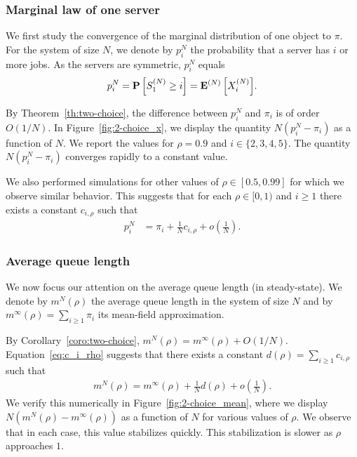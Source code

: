\documentclass[acmlarge]{acmart}
\newcommand\SN{S^{(N)}}
\newcommand\XN{X^{(N)}}
\newcommand\espN[1]{{\mathchoice{\bespN{#1}}{\sespN{#1}}{\sespN{#1}}{\sespN{#1}}}}
\newcommand\bespN[1]{\mathbf{E}^{(N)}\left[#1\right]}
\newcommand\sespN[1]{\mathbf{E}^{(N)}[#1]}
\newcommand\Proba[1]{{\mathchoice{\bProba{#1}}{\sProba{#1}}{\sProba{#1}}{\sProba{#1}}}}
\newcommand\bProba[1]{\mathbf{P}\left[#1\right]}
\newcommand\sProba[1]{\mathbf{P}[#1]}
\newcommand\p[1]{\left(#1\right)}
\begin{document}
\subsubsection{Marginal law of one server}

We first study the convergence of the marginal distribution of one
object to $\pi$. For the system of size $N$, we denote by $p^N_i$ the
probability that a server has $i$ or more jobs. As the servers are
symmetric, $p^N_i$ equals
\begin{align*}
  p^N_i=\Proba{\SN_1\ge i} = \espN{\XN_i}. 
\end{align*}

By Theorem~\ref{th:two-choice}, the difference between $p^N_i$ and
$\pi_i$ is of order $O(1/N)$. In Figure~\ref{fig:2-choice_x}, we
display the quantity $N(p^N_i-\pi_i)$ as a function of $N$. We report
the values for $\rho=0.9$ and $i\in\{2,3,4,5\}$. The quantity
$N(p^N_i-\pi_i)$ converges rapidly to a constant value.

We also performed simulations for other values of $\rho\in[0.5,0.99]$
for which we observe similar behavior.  This suggests that for each
$\rho\in[0,1)$ and $i\ge1$ there exists a constant $c_{i,\rho}$ such
that
\begin{align}
  \label{eq:c_i_rho}
  p^N_i&=\pi_i + \frac1N c_{i,\rho} + o\p{\frac1N}.
\end{align}


\subsubsection{Average queue length}


We now focus our attention on the average queue length (in
steady-state). We denote by $m^N(\rho)$ the average queue length in
the system of size $N$ and by $m^\infty(\rho)= \sum_{i\ge1}\pi_i$ its
mean-field approximation.

By Corollary~\ref{coro:two-choice},
$m^N(\rho) = m^\infty(\rho)+O(1/N)$. Equation~\eqref{eq:c_i_rho}
suggests that there exists a constant
$d(\rho)=\sum_{i\ge1}c_{i,\rho}$ such that
\begin{align}
  \label{eq:improved_mf}
  m^N(\rho)=m^\infty(\rho) + \frac{1}{N}d(\rho) + o\p{\frac1N}.
\end{align} 
We verify this numerically in Figure~\ref{fig:2-choice_mean}, where we
display $N(m^N(\rho)-m^\infty(\rho))$ as a function of $N$ for various
values of $\rho$.  We observe that in each case, this value stabilizes
quickly. This stabilization is slower as $\rho$ approaches $1$.
\end{document}
